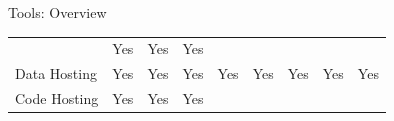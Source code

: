 \documentclass[ignorenonframetext,]{beamer}
\begin{document}
\begin{frame}{Tools: Overview}
\begin{longtable}[]{@{}lcccccccc@{}}
\begin{minipage}[t]{0.04\columnwidth}
\end{minipage} & \begin{minipage}[t]{0.06\columnwidth}\centering
Yes\strut
\end{minipage} & \begin{minipage}[t]{0.15\columnwidth}\centering
Yes\strut
\end{minipage} & \begin{minipage}[t]{0.18\columnwidth}\centering
Yes\strut
\end{minipage}\tabularnewline
\begin{minipage}[t]{0.12\columnwidth}\raggedright
Data Hosting\strut
\end{minipage} & \begin{minipage}[t]{0.05\columnwidth}\centering
Yes\strut
\end{minipage} & \begin{minipage}[t]{0.05\columnwidth}\centering
Yes\strut
\end{minipage} & \begin{minipage}[t]{0.05\columnwidth}\centering
Yes\strut
\end{minipage} & \begin{minipage}[t]{0.07\columnwidth}\centering
Yes\strut
\end{minipage} & \begin{minipage}[t]{0.04\columnwidth}\centering
Yes\strut
\end{minipage} & \begin{minipage}[t]{0.06\columnwidth}\centering
Yes\strut
\end{minipage} & \begin{minipage}[t]{0.15\columnwidth}\centering
Yes\strut
\end{minipage} & \begin{minipage}[t]{0.18\columnwidth}\centering
Yes\strut
\end{minipage}\tabularnewline
\begin{minipage}[t]{0.12\columnwidth}\raggedright
Code Hosting\strut
\end{minipage} & \begin{minipage}[t]{0.05\columnwidth}\centering
Yes\strut
\end{minipage} & \begin{minipage}[t]{0.05\columnwidth}\centering
Yes\strut
\end{minipage} & \begin{minipage}[t]{0.05\columnwidth}\centering
Yes\strut
\end{minipage} & \begin{minipage}[t]{0.07\columnwidth}\centering

\end{minipage}
\end{longtable}
\end{frame}
\end{document}
